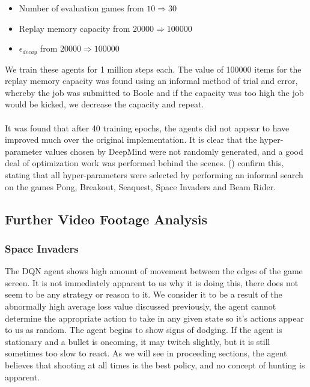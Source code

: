 \begin{itemize}
	\item Number of evaluation games from $10 \Rightarrow 30$
	\item Replay memory capacity from $20000 \Rightarrow 100000$
	\item $\epsilon_{decay}$ from $20000 \Rightarrow 100000$
\end{itemize}

We train these agents for 1 million steps each. The value of 100000 items for the replay memory capacity was found using an informal method of trial and error, whereby the job was submitted to Boole and if the capacity was too high the job would be kicked, we decrease the capacity and repeat. \paragraph{}

It was found that after 40 training epochs, the agents did not appear to have improved much over the original implementation. It is clear that the hyper-parameter values chosen by DeepMind were not randomly generated, and a good deal of optimization work was performed behind the scenes. (\citet{human}) confirm this, stating that all hyper-parameters were selected by performing an informal search on the games Pong, Breakout, Seaquest, Space Invaders and Beam Rider.

\subsection{Further Video Footage Analysis} \label{sec:video_analysis}
\subsubsection{Space Invaders}
The DQN agent shows high amount of movement between the edges of the game screen. It is not immediately apparent to us why it is doing this, there does not seem to be any strategy or reason to it. We consider it to be a result of the abnormally high average loss value discussed previously, the agent cannot determine the appropriate action to take in any given state so it's actions appear to us as random. The agent begins to show signs of dodging. If the agent is stationary and a bullet is oncoming, it may twitch slightly, but it is still sometimes too slow to react. As we will see in proceeding sections, the agent believes that shooting at all times is the best policy, and no concept of hunting is apparent. \paragraph{}

